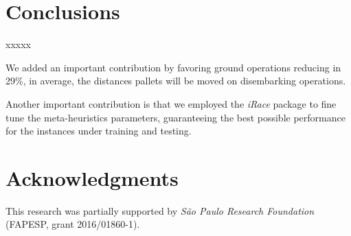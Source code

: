 \documentclass[preprint,authoryear]{elsarticle}
\begin{document}
\section{Conclusions}
\label{sec7}

xxxxx

We added an important contribution by favoring ground operations reducing in 29\%, in average, the distances pallets will be moved on disembarking operations.

Another important contribution is that we employed the {\it iRace} package to fine tune the meta-heuristics parameters, guaranteeing the best possible performance for the instances under training and testing.

\section*{Acknowledgments}

This research was partially supported by \textit{São Paulo Research Foundation} (FAPESP, grant 2016/01860-1).




\end{document}
